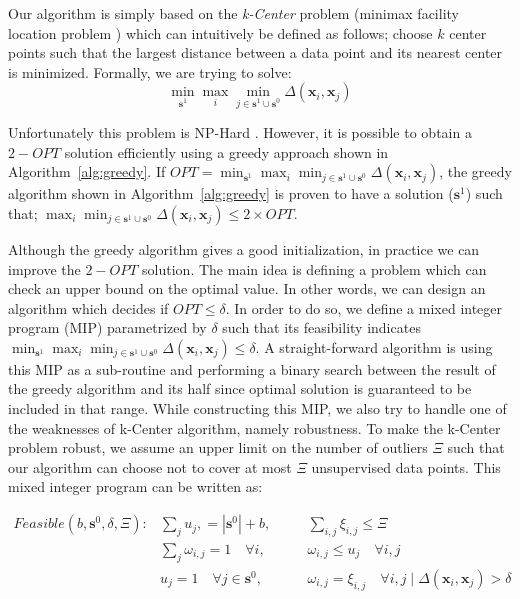 \documentclass{article}
\begin{document}
Our algorithm is simply based on the \emph{k-Center} problem (minimax facility location problem \cite{facility}) which can intuitively be defined as follows; choose $k$ center points such that the largest distance between a data point and its nearest center is minimized. Formally, we are trying to solve:
\begin{equation}
\min_{\mathbf{s}^1} \max_i \min_{j \in \mathbf{s}^1 \cup \mathbf{s}^0} \Delta(\mathbf{x}_i,\mathbf{x}_j)
\end{equation}



Unfortunately this problem is NP-Hard \cite{cook}. However, it is possible to obtain a $2-OPT$ solution efficiently using a greedy approach shown in  Algorithm~\ref{alg:greedy}. If $OPT=\min_{\mathbf{s}^1} \max_i \min_{j \in \mathbf{s}^1 \cup \mathbf{s}^0} \Delta(\mathbf{x}_i,\mathbf{x}_j)$, the greedy algorithm shown in Algorithm~\ref{alg:greedy} is proven to have a solution ($\mathbf{s}^1$) such that; $ \max_i \min_{j \in \mathbf{s}^1 \cup \mathbf{s}^0} \Delta(\mathbf{x}_i,\mathbf{x}_j) \leq 2 \times OPT$.

Although the greedy algorithm gives a good initialization, in practice we can improve the $2-OPT$ solution. The main idea is defining a problem which can check an upper bound on the optimal value. In other words, we can design an algorithm which decides if $OPT \leq \delta$. In order to do so, we define a mixed integer program (MIP) parametrized by $\delta$ such that its feasibility indicates $\min_{\mathbf{s}^1} \max_i \min_{j \in \mathbf{s}^1 \cup \mathbf{s}^0} \Delta(\mathbf{x}_i,\mathbf{x}_j) \leq \delta$. A straight-forward algorithm is using this MIP as a sub-routine and performing a binary search between the result of the greedy algorithm and its half since optimal solution is guaranteed to be included in that range. While constructing this MIP, we also try to handle one of the weaknesses of k-Center algorithm, namely robustness. To make the k-Center problem robust, we assume an upper limit on the number of outliers $\Xi$ such that our algorithm can choose not to cover at most $\Xi$ unsupervised data points. This mixed integer program can be written as:

\begin{equation}
\begin{aligned}
Feasible(b,\mathbf{s}^0,\delta, \Xi):  &\sum_j  u_j, = |\mathbf{s}^0|+ b,  \quad &&  \sum_{i,j} \xi_{i,j} \leq \Xi \\
&\sum_j \omega_{i,j} = 1\quad \forall  i, \quad && \omega_{i,j} \leq u_j \quad \forall  i,j \\
   & u_j =1 \quad \forall j\in \mathbf{s}^0, \quad && \omega_{i,j} = \xi_{i,j} \quad  \forall i,j \mid   \Delta(\mathbf{x}_i,\mathbf{x}_j)  > \delta\\
\end{aligned}
\label{mipfeasible}
\end{equation}
\end{document}
